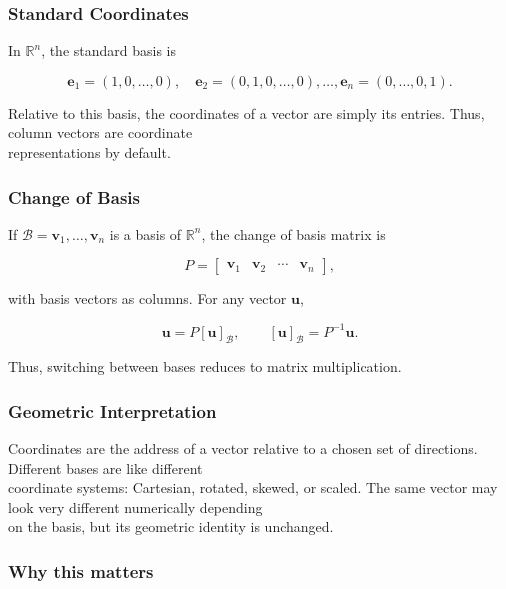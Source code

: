 \documentclass[
  12pt,
  a4paper,
]{article}
\begin{document}
\subsubsection{Standard Coordinates}\label{standard-coordinates}

In \(\mathbb{R}^n\), the standard basis is

\[\mathbf{e}_1 = (1,0,\dots,0), \quad \mathbf{e}_2 = (0,1,0,\dots,0), \dots, \mathbf{e}_n = (0,\dots,0,1).\]

Relative to this basis, the coordinates of a vector are simply its
entries. Thus, column vectors are coordinate\\
representations by default.

\subsubsection{Change of Basis}\label{change-of-basis}

If \(\mathcal{B} = {\mathbf{v}_1, \dots, \mathbf{v}_n}\) is a basis of
\(\mathbb{R}^n\), the change of basis matrix is

\[P = \begin{bmatrix} \mathbf{v}_1 & \mathbf{v}_2 & \cdots & \mathbf{v}_n \end{bmatrix},\]

with basis vectors as columns. For any vector \(\mathbf{u}\),

\[\mathbf{u} = P [\mathbf{u}]_{\mathcal{B}}, \qquad [\mathbf{u}]_{\mathcal{B}} = P^{-1}\mathbf{u}.\]

Thus, switching between bases reduces to matrix multiplication.

\subsubsection{Geometric
Interpretation}\label{geometric-interpretation-7}

Coordinates are the address of a vector relative to a chosen set of
directions. Different bases are like different\\
coordinate systems: Cartesian, rotated, skewed, or scaled. The same
vector may look very different numerically depending\\
on the basis, but its geometric identity is unchanged.

\subsubsection{Why this matters}\label{why-this-matters-15}
\end{document}
